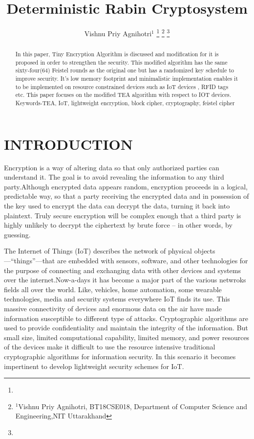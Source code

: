 \documentclass[letterpaper, 12 pt, conference]{ieeeconf}  %
\title{\LARGE \bf
Deterministic Rabin Cryptosystem
}
\author{Vishnu Priy Agnihotri$^{1}$ %
\thanks{}%
\thanks{$^{1}$Vishnu Priy Agnihotri, BT18CSE018, Department of Computer Science and Engineering,NIT Uttarakhand}%
\thanks{}%
}
\begin{document}
\maketitle
\thispagestyle{empty}
\pagestyle{empty}


\begin{abstract}

In this paper, Tiny Encryption Algorithm is discussed and modification for it is proposed in order to strengthen the security. This modified algorithm has the same sixty-four(64) Feistel rounds as the original one but has a randomized key schedule to improve security. It's low memory footprint and minimalistic implementation enables it to be implemented on resource constrained devices such as IoT devices , RFID tags etc. This paper focuses on the modified TEA algorithm with respect to IOT devices.
 Keywords-TEA, IoT, lightweight encryption, block cipher, cryptography, feistel cipher



\end{abstract}


\section{INTRODUCTION}

Encryption is a way of altering data so that only authorized parties can understand it. The goal is to avoid revealing the information to any third party.Although encrypted data appears random, encryption proceeds in a logical, predictable way, so that a party receiving the encrypted data and in possession of the key used to encrypt the data can decrypt the data, turning it back into plaintext. Truly secure encryption will be complex enough that a third party is highly unlikely to decrypt the ciphertext by brute force – in other words, by guessing.

The Internet of Things (IoT) describes the network of physical objects—“things”—that are embedded with sensors, software, and other technologies for the purpose of connecting and exchanging data with other devices and systems over the internet.Now-a-days it has become a major part of the various netwroks fields all over the world. Like, vehicles, home automation,
some wearable technologies, media and security systems everywhere IoT finds its use. This massive connectivity of devices and enormous data on the air have made information susceptible to diﬀerent type of attacks. Cryptographic algorithms are used to provide conﬁdentiality and maintain the integrity of the information. But small size, limited computational capability, limited memory, and power resources of the devices make it diﬃcult to use the resource intensive traditional cryptographic algorithms for information security. In this scenario it becomes impertinent to develop lightweight security schemes for IoT.
\end{document}
